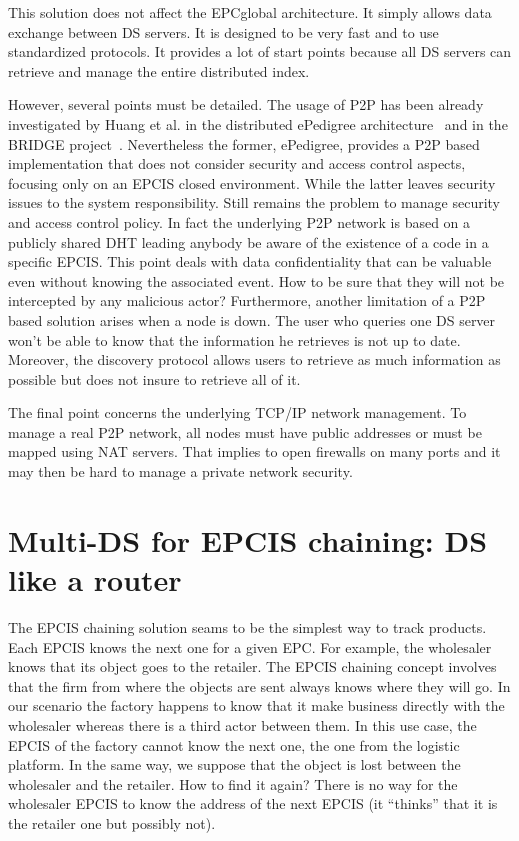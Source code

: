\documentclass[a4paper]{llncs}
\begin{document}
This solution does not affect the EPCglobal architecture. It simply allows data exchange between DS servers. It is designed to be very fast and to use standardized protocols. It provides a lot of start points because all DS servers can retrieve and manage the entire distributed index.

However, several points must be detailed. The usage of P2P has been already investigated by Huang et
al. in the distributed ePedigree architecture~\cite{epedigree} and in the BRIDGE
project~\cite{BRIDGE}. Nevertheless the former, ePedigree, provides a P2P based implementation that
does not consider security and access control aspects, focusing only on an EPCIS closed environment.
While the latter leaves security issues to the system responsibility. Still remains the problem to
manage security and access control policy. In fact the underlying P2P network is based on a publicly
shared DHT leading anybody be aware of the existence of a code in a specific EPCIS. This point deals
with data confidentiality that can be valuable even without knowing the associated event. How to be
sure that they will not be intercepted by any malicious actor? Furthermore, another limitation of a
P2P based solution arises when a node is down. The user who queries one DS server won't be able to
know that the information he retrieves is not up to date. Moreover, the discovery protocol allows
users to retrieve as much information as possible but does not insure to retrieve all of it.

The final point concerns the underlying TCP/IP network management. To manage a real P2P network, all
nodes must have public addresses or must be mapped using NAT servers. That implies to open firewalls
on many ports and it may then be hard to manage a private network security.

\section{Multi-DS for EPCIS chaining: DS like a router}

The EPCIS chaining solution seams to be the simplest way to track products. Each EPCIS knows the
next one for a given EPC. For example, the wholesaler knows that its object goes to the retailer.
The EPCIS chaining concept involves that the firm from where the objects are sent always knows where
they will go. In our scenario the factory happens to know that it make business directly with the
wholesaler whereas there is a third actor between them. In this use case, the EPCIS of the factory
cannot know the next one, the one from the logistic platform. In the same way, we suppose that the
object is lost between the wholesaler and the retailer. How to find it again? There is no way for
the wholesaler EPCIS to know the address of the next EPCIS (it ``thinks'' that it is the retailer
one but possibly not).
\end{document}
